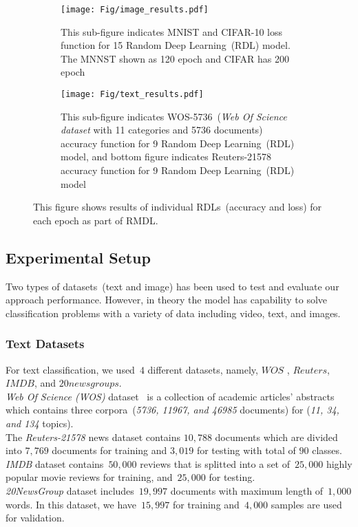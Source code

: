 \documentclass[sigconf, final]{acmart}
\begin{document}
\begin{figure*}[htbp]
    \centering
    \begin{subfigure}[t]{0.479\textwidth}
        \texttt{[image: Fig/image\_results.pdf]}
        \caption{This sub-figure indicates MNIST and CIFAR-10 loss function for 15 Random Deep Learning~(RDL) model. The MNNST shown as 120 epoch and CIFAR has 200 epoch}\label{fig:image_loss}
    \end{subfigure}
  \hfill
    \begin{subfigure}[t]{0.5\textwidth}
        \texttt{[image: Fig/text\_results.pdf]}
        \caption{This sub-figure indicates WOS-5736~(\textit{Web Of Science dataset} with 11 categories and 5736 documents) accuracy function for 9 Random Deep Learning~(RDL) model, and bottom figure indicates Reuters-21578 accuracy function for 9 Random Deep Learning~(RDL) model}
        \label{fig:text_accuracy}
    \end{subfigure}
    \caption{This figure shows results of individual RDLs~(accuracy and loss) for each epoch as part of RMDL.}
    \label{fig:results}
 
\end{figure*}



\subsection{Experimental Setup} 
Two types of datasets~(text and image) has been used to test and evaluate our approach performance. However, in theory the model has capability to solve classification problems with a variety of data including video, text, and images.  
\subsubsection{Text Datasets}
For text classification, we used~$4$ different datasets, namely, $WOS$ , $Reuters$, $IMDB$, and $20newsgroups$.\\ \textit{Web Of Science (WOS)} dataset~\cite{kowsari2018WOS} is a collection of academic articles' abstracts which contains three corpora~(\textit{5736, 11967, and 46985 }documents) for (\textit{11, 34, and 134} topics).\\ The \textit{Reuters-21578}  news dataset contains $10,788$ documents which are divided into $7,769$ documents for training and $3,019$ for testing with total of $90$ classes.\\
\textit{IMDB} dataset contains~$50,000$ reviews that is splitted into a set of~$25,000$ highly popular movie reviews for training, and~$25,000$ for testing.\\
\textit{20NewsGroup} dataset includes~$19,997$ documents with maximum length of~$1,000$ words. In this dataset, we have~$15,997$ for training and~$4,000$ samples are used for validation.
\end{document}
